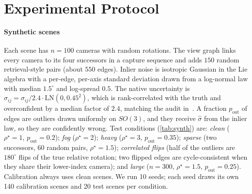 \section{Experimental Protocol}\label{sec:protocol}

\paragraph*{Synthetic scenes} Each scene has $n=100$ cameras with random rotations. The view graph links every camera to its four successors in a capture sequence and adds $150$ random retrieval-style pairs (about $550$ edges). Inlier noise is isotropic Gaussian in the Lie algebra with a per-edge, per-axis standard deviation drawn from a log-normal law with median $1.5^\circ$ and log-spread $0.5$. The native uncertainty is $\hat\sigma_{ij}=\sigma_{ij}/2.4\cdot\mathrm{LN}(0,0.45^2)$, which is rank-correlated with the truth and overconfident by a median factor of $2.4$, matching the audit in~\cite{deng2026audit}. A fraction $p_{\mathrm{out}}$ of edges are outliers drawn uniformly on $SO(3)$, and they receive $\hat\sigma$ from the inlier law, so they are confidently wrong. Test conditions (\cref{tab:synth}) are: \emph{clean} ($\rho^\star=1$, $p_{\mathrm{out}}=0.2$); \emph{fog} ($\rho^\star=2$); \emph{heavy} ($\rho^\star=3$, $p_{\mathrm{out}}=0.35$); \emph{sparse} (two successors, 60 random pairs, $\rho^\star=1.5$); \emph{correlated flips} (half of the outliers are $180^\circ$ flips of the true relative rotation; two flipped edges are cycle-consistent when they share their lower-index camera); and \emph{large} ($n=300$, $\rho^\star=1.5$, $p_{\mathrm{out}}=0.25$). Calibration always uses clean scenes. We run 10 seeds; each seed draws its own 140 calibration scenes and 20 test scenes per condition.

